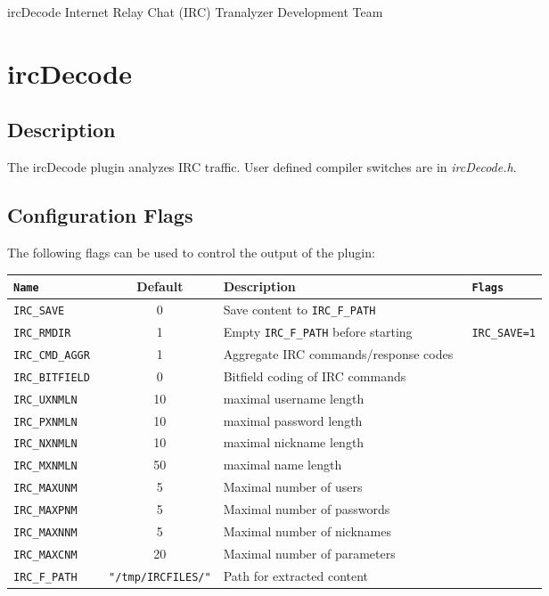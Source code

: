 \documentclass[documentation]{subfiles}
\begin{document}
\trantitle
    {ircDecode}
    {Internet Relay Chat (IRC)}
    {Tranalyzer Development Team} %

\section{ircDecode}\label{s:ircDecode}

\subsection{Description}
The ircDecode plugin analyzes IRC traffic.
User defined compiler switches are in {\em ircDecode.h}.

\subsection{Configuration Flags}
The following flags can be used to control the output of the plugin:
\begin{longtable}{>{\tt}lcl>{\tt\small}l}
    \toprule
    {\bf Name} & {\bf Default} & {\bf Description} & {\bf Flags}\\
    \midrule\endhead%
    IRC\_SAVE      &  0 & Save content to {\tt\small IRC\_F\_PATH}             & \\
    IRC\_RMDIR     &  1 & Empty {\tt\small IRC\_F\_PATH} before starting       & IRC\_SAVE=1\\
    IRC\_CMD\_AGGR &  1 & Aggregate IRC commands/response codes                & \\
    IRC\_BITFIELD  &  0 & Bitfield coding of IRC commands                      & \\
    IRC\_UXNMLN    & 10 & maximal username length                              & \\
    IRC\_PXNMLN    & 10 & maximal password length                              & \\
    IRC\_NXNMLN    & 10 & maximal nickname length                              & \\
    IRC\_MXNMLN    & 50 & maximal name length                                  & \\
    IRC\_MAXUNM    &  5 & Maximal number of users                              & \\
    IRC\_MAXPNM    &  5 & Maximal number of passwords                          & \\
    IRC\_MAXNNM    &  5 & Maximal number of nicknames                          & \\
    IRC\_MAXCNM    & 20 & Maximal number of parameters                         & \\

    IRC\_F\_PATH   & {\tt\small "/tmp/IRCFILES/"} & Path for extracted content & \\
    \bottomrule
\end{longtable}
\end{document}
